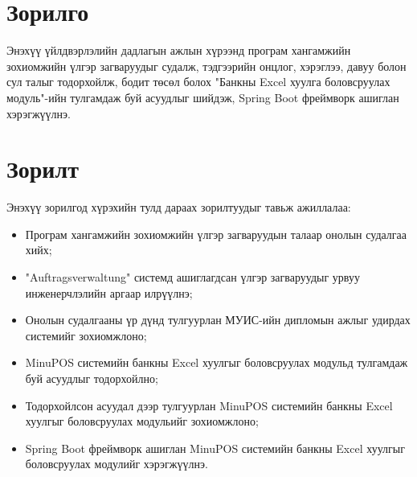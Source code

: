 \section{Зорилго}
	\quad \quad	Энэхүү үйлдвэрлэлийн дадлагын ажлын хүрээнд програм хангамжийн зохиомжийн үлгэр загваруудыг судалж, тэдгээрийн онцлог, хэрэглээ, давуу болон сул талыг тодорхойлж, бодит төсөл болох "Банкны Excel хуулга боловсруулах модуль"-ийн тулгамдаж буй асуудлыг шийдэж, Spring Boot фреймворк ашиглан хэрэгжүүлнэ.

\section{Зорилт}
	\quad \quad	Энэхүү зорилгод хүрэхийн тулд дараах зорилтуудыг тавьж ажиллалаа:
	\begin{itemize}
		\item Програм хангамжийн зохиомжийн үлгэр загваруудын талаар онолын судалгаа хийх;
		\item "Auftragsverwaltung" системд ашиглагдсан үлгэр загваруудыг урвуу инженерчлэлийн аргаар илрүүлнэ;
		\item  Онолын судалгааны үр дүнд тулгуурлан МУИС-ийн дипломын ажлыг удирдах системийг зохиомжлоно;
		\item MinuPOS системийн банкны Excel хуулгыг боловсруулах модульд тулгамдаж буй асуудлыг тодорхойлно;
		\item Тодорхойлсон асуудал дээр тулгуурлан MinuPOS системийн банкны Excel хуулгыг боловсруулах модульийг зохиомжлоно;
		\item Spring Boot фреймворк ашиглан MinuPOS системийн банкны Excel хуулгыг боловсруулах модулийг хэрэгжүүлнэ.
	\end{itemize}
